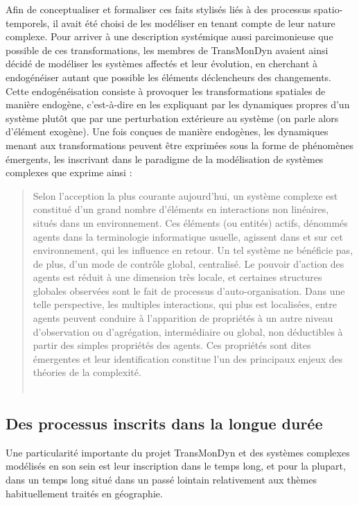 Afin de conceptualiser et formaliser ces faits stylisés liés à des processus spatio-temporels, il avait été choisi de les modéliser en tenant compte de leur nature complexe.
Pour arriver à une description systémique aussi parcimonieuse que possible de ces transformations, les membres de TransMonDyn avaient ainsi décidé de modéliser les systèmes affectés et leur évolution, en cherchant à \og endogénéiser\fg{} autant que possible les éléments déclencheurs des changements.
Cette endogénéisation consiste à provoquer les transformations spatiales de manière endogène, c'est-à-dire en les expliquant par les dynamiques propres d'un système plutôt que par une perturbation extérieure au système (on parle alors d'élément exogène).
Une fois conçues de manière endogènes, les dynamiques menant aux transformations peuvent être exprimées sous la forme de phénomènes émergents, les inscrivant dans le paradigme de la modélisation de systèmes complexes que  exprime ainsi :
\begin{quotation}
\noindent \og Selon l'acception la plus courante aujourd'hui, un système complexe est constitué d'un grand nombre d'éléments en interactions non linéaires, situés dans un environnement.
Ces éléments (ou entités) actifs, dénommés agents dans la terminologie informatique usuelle, agissent dans et sur cet environnement, qui les influence en retour.
Un tel système ne bénéficie pas, de plus, d'un mode de contrôle global, centralisé.
Le pouvoir d'action des agents est réduit à une dimension très locale, et certaines structures globales observées sont le fait de processus d'auto-­organisation.
Dans une telle perspective, les multiples interactions, qui plus est localisées, entre agents peuvent conduire à l'apparition de propriétés à un autre niveau d'observation ou d'agrégation, intermédiaire ou global, non déductibles à partir des simples propriétés des agents.
Ces propriétés sont dites émergentes et leur identification constitue l'un des principaux enjeux des théories de la complexité. 
\fg{}\\
\mbox{}~ \hfill \cite[39-40]{banos_pour_2013}  	
  
\end{quotation}

\subsection{Des processus inscrits dans la longue durée}

Une particularité importante du projet TransMonDyn et des systèmes complexes modélisés en son sein est leur inscription dans le temps long, et pour la plupart, dans un temps long situé dans un passé lointain relativement aux thèmes habituellement traités en géographie.

